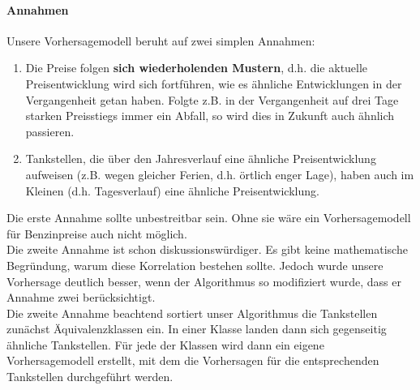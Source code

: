 \documentclass[11pt]{article}
\begin{document}
	\paragraph{Annahmen\\}
	Unsere Vorhersagemodell beruht auf zwei simplen Annahmen: 
	\begin{enumerate}
		\item Die Preise folgen \textbf{sich wiederholenden Mustern}, d.h. die aktuelle Preisentwicklung wird sich fortführen, wie es ähnliche Entwicklungen in der Vergangenheit getan haben. Folgte z.B. in der Vergangenheit auf drei Tage starken Preisstiegs immer ein Abfall, so wird dies in Zukunft auch ähnlich passieren. 
		\item Tankstellen, die über den Jahresverlauf eine ähnliche Preisentwicklung aufweisen (z.B. wegen gleicher Ferien, d.h. örtlich enger Lage), haben auch im Kleinen (d.h. Tagesverlauf) eine ähnliche Preisentwicklung.
	\end{enumerate}	
	Die erste Annahme sollte unbestreitbar sein. Ohne sie wäre ein Vorhersagemodell für Benzinpreise auch nicht möglich. \\
	Die zweite Annahme ist schon diskussionswürdiger. Es gibt keine mathematische Begründung, warum diese Korrelation bestehen sollte. Jedoch wurde unsere Vorhersage deutlich besser, wenn der Algorithmus so modifiziert wurde, dass er Annahme zwei berücksichtigt.\\
	Die zweite Annahme beachtend sortiert unser Algorithmus die Tankstellen zunächst Äquivalenzklassen ein. In einer Klasse landen dann sich gegenseitig ähnliche Tankstellen. Für jede der Klassen wird dann ein eigene Vorhersagemodell erstellt, mit dem die Vorhersagen für die entsprechenden Tankstellen durchgeführt werden. 
	
\end{document}
